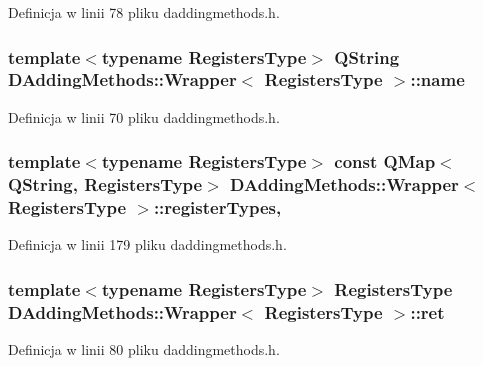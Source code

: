 Definicja w linii 78 pliku daddingmethods.\-h.

\hypertarget{class_d_adding_methods_1_1_wrapper_a41c5e8fdd7bde2f8610d2d499ae8f4b3}{
\subsubsection[{name}]{\setlength{\rightskip}{0pt plus 5cm}template$<$typename Registers\-Type$>$ Q\-String {\bf D\-Adding\-Methods\-::\-Wrapper}$<$ Registers\-Type $>$\-::name}}\label{class_d_adding_methods_1_1_wrapper_a41c5e8fdd7bde2f8610d2d499ae8f4b3}


Definicja w linii 70 pliku daddingmethods.\-h.

\hypertarget{class_d_adding_methods_1_1_wrapper_aa6b67c45d00922b17d7934cdafb98799}{
\subsubsection[{register\-Types}]{\setlength{\rightskip}{0pt plus 5cm}template$<$typename Registers\-Type$>$ const Q\-Map$<$Q\-String, Registers\-Type$>$ {\bf D\-Adding\-Methods\-::\-Wrapper}$<$ Registers\-Type $>$\-::register\-Types\hspace{0.3cm}{\ttfamily [static]}, {\ttfamily [private]}}}\label{class_d_adding_methods_1_1_wrapper_aa6b67c45d00922b17d7934cdafb98799}


Definicja w linii 179 pliku daddingmethods.\-h.

\hypertarget{class_d_adding_methods_1_1_wrapper_ae7d3f4a32619b51a7f0f0e53fbc87d38}{
\subsubsection[{ret}]{\setlength{\rightskip}{0pt plus 5cm}template$<$typename Registers\-Type$>$ Registers\-Type {\bf D\-Adding\-Methods\-::\-Wrapper}$<$ Registers\-Type $>$\-::ret}}\label{class_d_adding_methods_1_1_wrapper_ae7d3f4a32619b51a7f0f0e53fbc87d38}


Definicja w linii 80 pliku daddingmethods.\-h.

